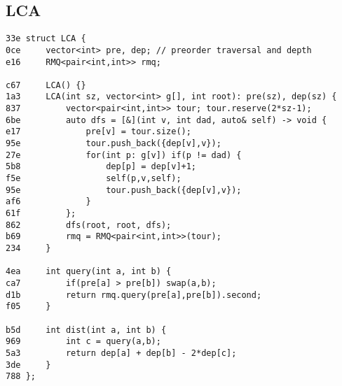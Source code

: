 \documentclass[11pt, a4paper, twoside]{article}
\begin{document}
\subsection{LCA}
\begin{lstlisting}
33e struct LCA {
0ce 	vector<int> pre, dep; // preorder traversal and depth
e16 	RMQ<pair<int,int>> rmq;
    
c67 	LCA() {}
1a3 	LCA(int sz, vector<int> g[], int root): pre(sz), dep(sz) {
837 		vector<pair<int,int>> tour; tour.reserve(2*sz-1);
6be 		auto dfs = [&](int v, int dad, auto& self) -> void {
e17 			pre[v] = tour.size();
95e 			tour.push_back({dep[v],v});
27e 			for(int p: g[v]) if(p != dad) {
5b8 				dep[p] = dep[v]+1;
f5e 				self(p,v,self);
95e 				tour.push_back({dep[v],v});
af6 			}
61f 		};
862 		dfs(root, root, dfs);
b69 		rmq = RMQ<pair<int,int>>(tour);
234 	}
    
4ea 	int query(int a, int b) {
ca7 		if(pre[a] > pre[b]) swap(a,b);
d1b 		return rmq.query(pre[a],pre[b]).second;
f05 	}
    
b5d 	int dist(int a, int b) {
969 		int c = query(a,b);
5a3 		return dep[a] + dep[b] - 2*dep[c];
3de 	}
788 };
\end{lstlisting}
\end{document}
